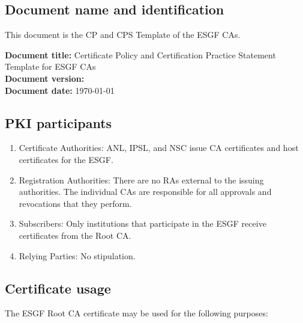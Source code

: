 \subsection{Document name and identification}\label{document-name-and-identification}

This document is the CP and CPS Template of the ESGF CAs.

\textbf{Document title:} Certificate Policy and Certification Practice Statement Template for ESGF CAs\\
\textbf{Document version:} \versionnum\\

\textbf{Document date:} \today

\subsection{PKI participants}\label{pki-participants}

\begin{enumerate}
\item
  
  Certificate Authorities: ANL, IPSL, and NSC issue CA certificates and host certificates for the ESGF.
  
\item
  
  Registration Authorities: There are no RAs external to the issuing
  authorities. The individual CAs are responsible for all approvals and revocations that they perform.
  
\item
  
  Subscribers: Only institutions that participate in the ESGF receive
  certificates from the Root CA.
  
\item
  
  Relying Parties: No stipulation.
  
\end{enumerate}

\subsection{Certificate usage}\label{certificate-usage}

The ESGF Root CA certificate may be used for the following purposes:

